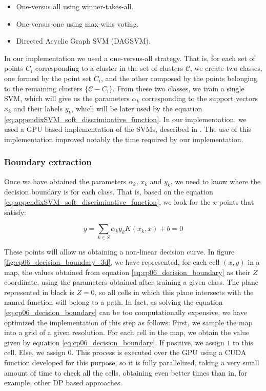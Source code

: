 \begin{itemize}
 \item One-versus all using winner-takes-all.
 \item One-versus-one using max-wins voting.
 \item Directed Acyclic Graph SVM (DAGSVM).
\end{itemize}

In our implementation we used a one-versus-all strategy. That is, for each set of points $C_i$ corresponding to a cluster in the set of clusters $\mathcal{C}$, we create two classes, one formed by the point set $C_i$, and the other composed by the points belonging to the remaining clusters $\{\mathcal{C} - C_i\}$. From these two classes, we train a single \ac{SVM}, which will give us the parameters $\alpha_k$ corresponding to the support vectors $x_k$ and their labels $y_k$, which will be later used by the equation \ref{eq:appendixSVM_soft_discriminative_function}. In our implementation, we used a \acs{GPU} based implementation of the \acp{SVM}, described in \cite{athanasopoulos2011gpu}. The use of this implementation improved notably the time required by our implementation.

\subsubsection{Boundary extraction}\label{ch:chapter06_01_01_04}

Once we have obtained the parameters $\alpha_k$, $x_k$ and $y_k$, we need to know where the decision boundary is for each class. That is, based on the equation \ref{eq:appendixSVM_soft_discriminative_function}, we look for the $x$ points that satisfy:

\begin{equation}\label{eq:cp06_decision_boundary}
 y = \sum_{k \in S} \alpha_k y_k K(x_k, x) + b = 0
\end{equation}

These points will allow us obtaining a non-linear decision curve. In figure \ref{fig:cp06_decision_boundary_3d}, we have represented, for each cell $(x,y)$ in a map, the values obtained from equation \ref{eq:cp06_decision_boundary} as their $Z$ coordinate, using the parameters obtained after training a given class. The plane represented in black is $Z=0$, so all cells in which this plane intersects with the named function will belong to a path.
In fact, as solving the equation \ref{eq:cp06_decision_boundary} can be too computationally expensive, we have optimized the implementation of this step as follows: First, we sample the map into a grid of a given resolution. For each cell in the map, we obtain the value given by equation \ref{eq:cp06_decision_boundary}. If positive, we assign $1$ to this cell. Else, we assign $0$. This process is executed over the \ac{GPU} using a \ac{CUDA} function developed for this purpose, so it is fully parallelized, taking a very small amount of time to check all the cells, obtaining even better times than in, for example, other \ac{DP} based approaches.


